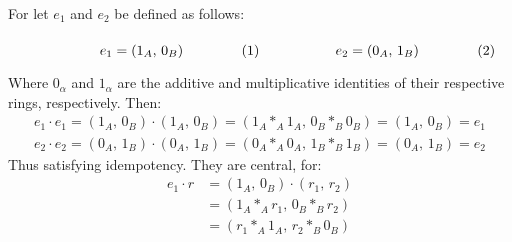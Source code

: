 \documentclass[crop=false,class=article]{standalone}                           %
\begin{document}
        \begin{solution}
            For let $e_{1}$ and $e_{2}$ be defined as follows:
            \par\hfill\par
            \begin{subequations}
                \begin{minipage}[b]{0.49\textwidth}
                    \begin{equation}
                        e_{1}=(1_{A},\,0_{B})
                    \end{equation}
                \end{minipage}
                \hfill
                \begin{minipage}[b]{0.49\textwidth}
                    \begin{equation}
                        e_{2}=(0_{A},\,1_{B})
                    \end{equation}
                \end{minipage}
            \end{subequations}
            \par\vspace{2.5ex}
            Where $0_{\alpha}$ and $1_{\alpha}$ are the additive and
            multiplicative identities of their respective rings,
            respectively. Then:
            \begin{subequations}
                \begin{align}
                    e_{1}\cdot{e}_{1}
                    =(1_{A},\,0_{B})\cdot(1_{A},\,0_{B})
                    =(1_{A}*_{A}1_{A},\,0_{B}*_{B}0_{B})
                    =(1_{A},\,0_{B})
                    =e_{1}\\
                    e_{2}\cdot{e}_{2}
                    =(0_{A},\,1_{B})\cdot(0_{A},\,1_{B})
                    =(0_{A}*_{A}0_{A},\,1_{B}*_{B}1_{B})
                    =(0_{A},\,1_{B})
                    =e_{2}
                \end{align}
            \end{subequations}
            Thus satisfying idempotency. They are central, for:
            \begin{subequations}
                \begin{align}
                    e_{1}\cdot{r}
                    &=(1_{A},\,0_{B})\cdot(r_{1},\,r_{2})\\
                    &=(1_{A}*_{A}r_{1},\,0_{B}*_{B}r_{2})\\
                    &=(r_{1}*_{A}1_{A},\,r_{2}*_{B}0_{B})\\

\end{align}
\end{subequations}
\end{solution}
\end{document}
